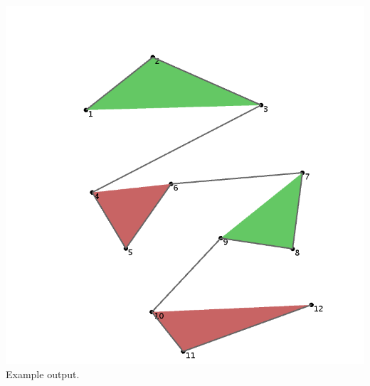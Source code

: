 \documentclass[a4paper,12pt]{article}
\begin{document}
\begin{minipage}[t]{0.625\textwidth}
\vspace{-145pt}
\projectSubmission
\end{minipage}
\hfill
%
\begin{minipage}[t]{0.3\textwidth}
\begin{center}
\includegraphics[width=0.975\linewidth]{../images/project0.png}
Example output.
\end{center}
\end{minipage}
\end{document}
